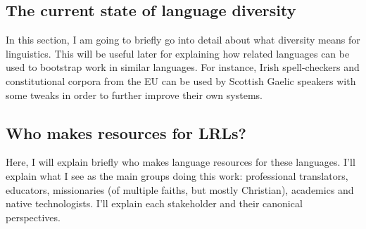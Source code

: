 \subsection{The current state of language diversity}

In this section, I am going to briefly go into detail about what diversity means for linguistics. This will be useful later for explaining how related languages can be used to bootstrap work in similar languages. For instance, Irish spell-checkers and constitutional corpora from the EU can be used by Scottish Gaelic speakers with some tweaks in order to further improve their own systems.



\subsection{Who makes resources for LRLs?}

Here, I will explain briefly who makes language resources for these languages. I'll explain what I see as the main groups doing this work: professional translators, educators, missionaries (of multiple faiths, but mostly Christian), academics and native technologists. I'll explain each stakeholder and their canonical perspectives.


